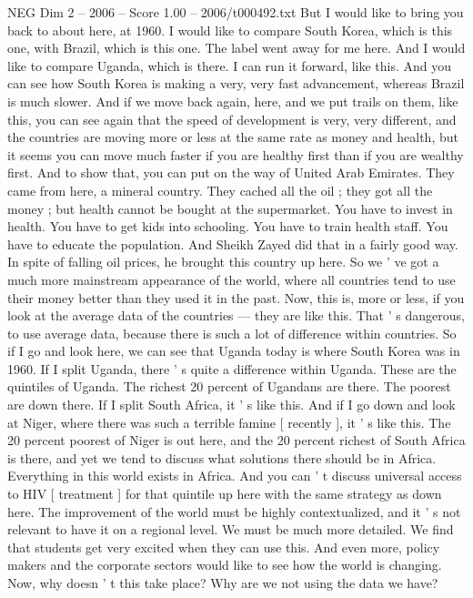 \begin{textsample}{NEG Dim 2 – 2006 – Score 1.00 – 2006/t000492.txt}
But I would like to bring you back to about here, at 1960.
I would like to compare South Korea, which is this one, with Brazil, which is this one.
The label went away for me here.
And I would like to compare Uganda, which is there.
I can run it forward, like this.
And you can see how South Korea is making a very, very fast advancement, whereas Brazil is much slower.
And if we move back again, here, and we put trails on them, like this, you can see again that the speed of development is very, very different, and the countries are moving more or less at the same rate as money and health, but it seems you can move much faster if you are healthy first than if you are wealthy first.
And to show that, you can put on the way of United Arab Emirates.
They came from here, a mineral country.
They cached all the oil ; they got all the money ; but health cannot be bought at the supermarket.
You have to invest in health.
You have to get kids into schooling.
You have to train health staff.
You have to educate the population.
And Sheikh Zayed did that in a fairly good way.
In spite of falling oil prices, he brought this country up here.
So we ' ve got a much more mainstream appearance of the world, where all countries tend to use their money better than they used it in the past.
Now, this is, more or less, if you look at the average data of the countries — they are like this.
That ' s dangerous, to use average data, because there is such a lot of difference within countries.
So if I go and look here, we can see that Uganda today is where South Korea was in 1960.
If I split Uganda, there ' s quite a difference within Uganda.
These are the quintiles of Uganda.
The richest 20 percent of Ugandans are there.
The poorest are down there.
If I split South Africa, it ' s like this.
And if I go down and look at Niger, where there was such a terrible famine [ recently ], it ' s like this.
The 20 percent poorest of Niger is out here, and the 20 percent richest of South Africa is there, and yet we tend to discuss what solutions there should be in Africa.
Everything in this world exists in Africa.
And you can ' t discuss universal access to HIV [ treatment ] for that quintile up here with the same strategy as down here.
The improvement of the world must be highly contextualized, and it ' s not relevant to have it on a regional level.
We must be much more detailed.
We find that students get very excited when they can use this.
And even more, policy makers and the corporate sectors would like to see how the world is changing.
Now, why doesn ' t this take place?
Why are we not using the data we have?

\end{textsample}
